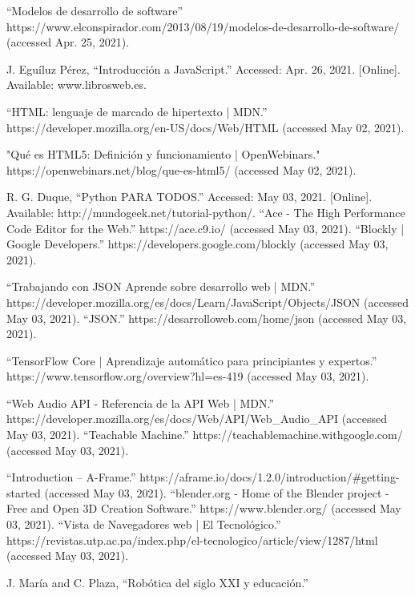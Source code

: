 \begin{thebibliography}{69}
“Modelos de desarrollo de software” https://www.elconspirador.com/2013/08/19/modelos-de-desarrollo-de-software/ (accessed Apr. 25, 2021).

 J. Eguíluz Pérez, “Introducción a JavaScript.” Accessed: Apr. 26, 2021. [Online]. Available: www.librosweb.es.


	“HTML: lenguaje de marcado de hipertexto | MDN.” https://developer.mozilla.org/en-US/docs/Web/HTML (accessed May 02, 2021).

"Qué es HTML5: Definición y funcionamiento | OpenWebinars." https://openwebinars.net/blog/que-es-html5/ (accessed May 02, 2021).


 R. G. Duque, “Python PARA TODOS.” Accessed: May 03, 2021. [Online]. Available: http://mundogeek.net/tutorial-python/.
 “Ace - The High Performance Code Editor for the Web.” https://ace.c9.io/ (accessed May 03, 2021).
 “Blockly  |  Google Developers.” https://developers.google.com/blockly (accessed May 03, 2021).




 “Trabajando con JSON \- Aprende sobre desarrollo web | MDN.” https://developer.mozilla.org/es/docs/Learn/JavaScript/Objects/JSON (accessed May 03, 2021).
“JSON.” https://desarrolloweb.com/home/json (accessed May 03, 2021).

 “TensorFlow Core | Aprendizaje automático para principiantes y expertos.” https://www.tensorflow.org/overview?hl=es-419 (accessed May 03, 2021).

“Web Audio API - Referencia de la API Web | MDN.” https://developer.mozilla.org/es/docs/Web/API/Web\_Audio\_API (accessed May 03, 2021).
“Teachable Machine.” https://teachablemachine.withgoogle.com/ (accessed May 03, 2021).

 “Introduction – A-Frame.” https://aframe.io/docs/1.2.0/introduction/\#getting-started (accessed May 03, 2021).
 “blender.org - Home of the Blender project - Free and Open 3D Creation Software.” https://www.blender.org/ (accessed May 03, 2021).
 “Vista de Navegadores web | El Tecnológico.” https://revistas.utp.ac.pa/index.php/el-tecnologico/article/view/1287/html (accessed May 03, 2021).

 J. María and C. Plaza, “Robótica del siglo XXI y educación.”


\end{thebibliography}
